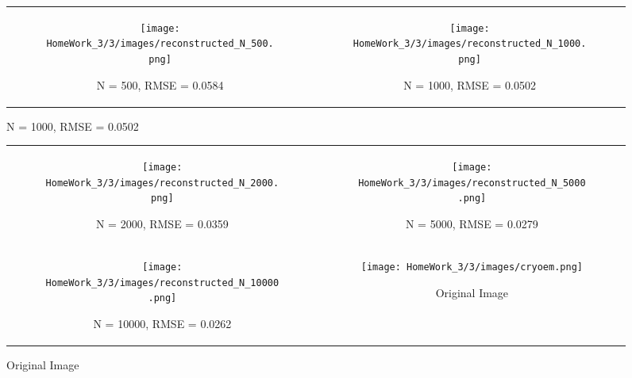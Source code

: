 \documentclass{article}
\begin{document}
\begin{enumerate}
\begin{figure}[!h]
\begin{tabular}{cc}
        \begin{subfigure}{0.45\textwidth}
            \centering
            \texttt{[image: HomeWork\_3/3/images/reconstructed\_N\_500.png]}
            \caption{N = 500, RMSE = 0.0584}
        \end{subfigure} &
        \begin{subfigure}{0.45\textwidth}
            \centering
            \texttt{[image: HomeWork\_3/3/images/reconstructed\_N\_1000.png]}
            \caption{N = 1000, RMSE = 0.0502}
        \end{subfigure} \\
    \end{tabular}
\end{figure}

\clearpage  %

\FloatBarrier
\begin{figure}[!h]
    \centering
    \begin{tabular}{cc}
        \begin{subfigure}{0.45\textwidth}
            \centering
            \texttt{[image: HomeWork\_3/3/images/reconstructed\_N\_2000.png]}
            \caption{N = 2000, RMSE = 0.0359}
        \end{subfigure} &
        \begin{subfigure}{0.45\textwidth}
            \centering
            \texttt{[image: HomeWork\_3/3/images/reconstructed\_N\_5000.png]}
            \caption{N = 5000, RMSE = 0.0279}
        \end{subfigure} \\
        
        \begin{subfigure}{0.45\textwidth}
            \centering
            \texttt{[image: HomeWork\_3/3/images/reconstructed\_N\_10000.png]}
            \caption{N = 10000, RMSE = 0.0262}
        \end{subfigure} &
        \begin{subfigure}{0.45\textwidth}
            \centering
            \texttt{[image: HomeWork\_3/3/images/cryoem.png]}
            \caption{Original Image}
        \end{subfigure} \\
    \end{tabular}
\end{figure}
\end{enumerate}
\end{document}
